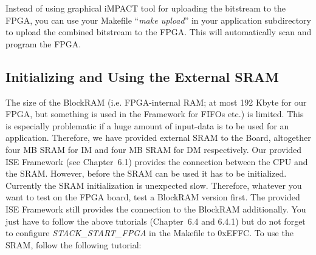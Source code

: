 Instead of using graphical iMPACT tool for uploading the bitstream to
the FPGA, you can use your Makefile ``\emph{make upload}'' in your
application subdirectory to upload the combined bitstream to the FPGA.
This will automatically scan and program the FPGA.

\hypertarget{initializing-and-using-the-external-sram}{%
\subsection{Initializing and Using the External
SRAM}\label{initializing-and-using-the-external-sram}}

The size of the BlockRAM (i.e. FPGA-internal RAM; at most 192 Kbyte for
our FPGA, but something is used in the Framework for FIFOs etc.) is
limited. This is especially problematic if a huge amount of input-data
is to be used for an application. Therefore, we have provided external
SRAM to the Board, altogether four MB SRAM for IM and four MB SRAM for
DM respectively. Our provided ISE Framework (see Chapter~6.1) provides
the connection between the CPU and the SRAM. However, before the SRAM
can be used it has to be initialized. Currently the SRAM initialization
is unexpected slow. Therefore, whatever you want to test on the FPGA
board, test a BlockRAM version first. The provided ISE Framework still
provides the connection to the BlockRAM additionally. You just have to
follow the above tutorials (Chapter~6.4 and 6.4.1) but do not forget to
configure \emph{STACK\_START\_FPGA} in the Makefile to 0xEFFC. To use
the SRAM, follow the following tutorial:


